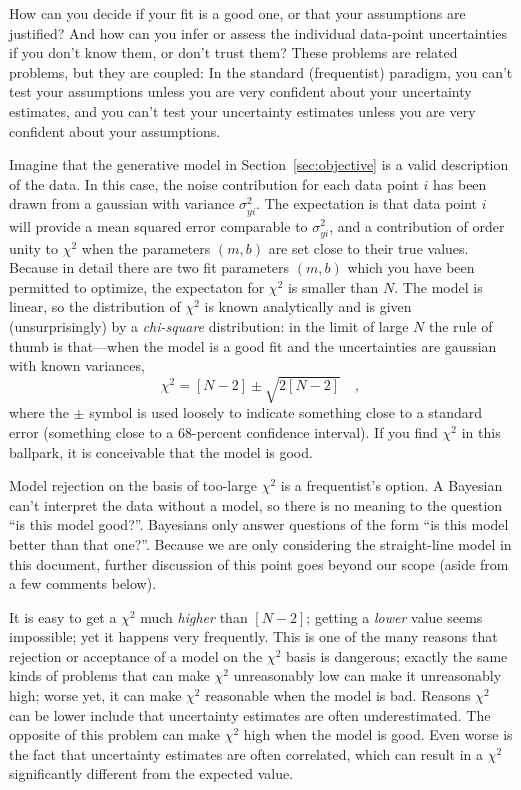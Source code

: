 \documentclass[12pt,twoside]{article}
\newcommand{\documentname}{document}
\newcommand{\sectionname}{Section}
\newcounter{problem}
\begin{document}
How can you decide if your fit is a good one, or that your assumptions
are justified?  And how can you infer or assess the individual
data-point uncertainties if you don't know them, or don't trust them?
These problems are related problems, but they are coupled: In the
standard (frequentist) paradigm, you can't test your assumptions
unless you are very confident about your uncertainty estimates, and
you can't test your uncertainty estimates unless you are very
confident about your assumptions.

Imagine that the generative model in \sectionname~\ref{sec:objective}
is a valid description of the data.  In this case, the noise
contribution for each data point $i$ has been drawn from a gaussian
with variance $\sigma_{yi}^2$.  The expectation is that data point $i$
will provide a mean squared error comparable to $\sigma_{yi}^2$, and a
contribution of order unity to $\chi^2$ when the parameters $(m,b)$
are set close to their true values.  Because in detail there are two
fit parameters $(m,b)$ which you have been permitted to optimize, the
expectaton for $\chi^2$ is smaller than $N$. The model is linear, so
the distribution of $\chi^2$ is known analytically and is given
(unsurprisingly) by a \emph{chi-square} distribution: in the limit of
large $N$ the rule of thumb is that---when the model is a good fit and
the uncertainties are gaussian with known variances,
\begin{equation}
\chi^2 = [N-2] \pm \sqrt{2[N-2]} \quad ,
\end{equation}
where the $\pm$ symbol is used loosely to indicate something close to
a standard error (something close to a 68-percent confidence
interval).  If you find $\chi^2$ in this ballpark, it is conceivable
that the model is good.

Model rejection on the basis of too-large $\chi^2$ is a frequentist's
option.  A Bayesian can't interpret the data without a model, so there
is no meaning to the question ``is this model good?''.  Bayesians only
answer questions of the form ``is this model better than that one?''.
Because we are only considering the straight-line model in this
\documentname, further discussion of this point goes beyond our scope
(aside from a few comments below).

It is easy to get a $\chi^2$ much \emph{higher} than $[N-2]$; getting
a \emph{lower} value seems impossible; yet it happens very frequently.
This is one of the many reasons that rejection or acceptance of a
model on the $\chi^2$ basis is dangerous; exactly the same kinds of
problems that can make $\chi^2$ unreasonably low can make it
unreasonably high; worse yet, it can make $\chi^2$ reasonable when the
model is bad.  Reasons $\chi^2$ can be lower include that uncertainty
estimates are often underestimated. The opposite of this problem can
make $\chi^2$ high when the model is good. Even worse is the fact that
uncertainty estimates are often correlated, which can result in a
$\chi^2$ significantly different from the expected value.
\end{document}
